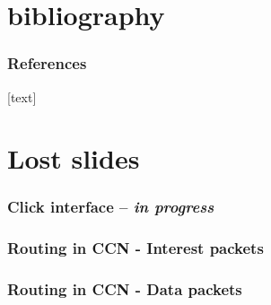 \extraslidesbegin

\section*{bibliography}
\begin{frame}[allowframebreaks]
  \frametitle{References}

  [text]
  
  
\end{frame}


\section*{Lost slides}
\begin{frame}[fragile]
  \frametitle{Click interface -- \textit{in progress}}
  
\end{frame}

\begin{frame}[fragile]
  \frametitle{Routing in CCN - Interest packets}
  \begin{algorithm}[H]
    \DontPrintSemicolon
    
  \end{algorithm}
\end{frame}

\begin{frame}[fragile]
  \frametitle{Routing in CCN - Data packets}
  \begin{algorithm}[H]
    \DontPrintSemicolon
    
  \end{algorithm}
\end{frame}

